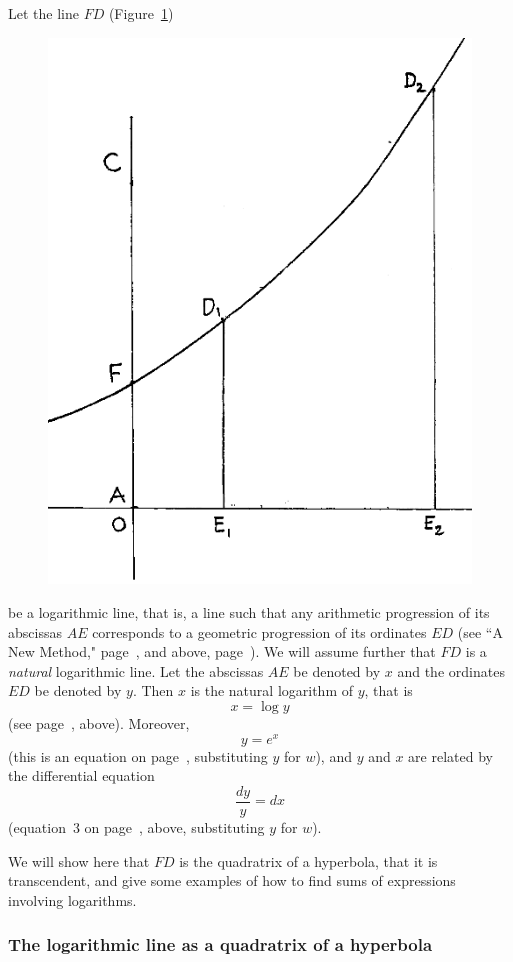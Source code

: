\documentclass[twoside,openright]{article}
\begin{document}
Let the line $FD$ (Figure~\ref{logline})
\begin{figure}[htp]
\begin{center}
\includegraphics[width=.65\textwidth]{fig/Figure51}
\caption{}
\label{logline}
\vspace{-10pt}
\end{center}
\end{figure}  be a logarithmic line, that is, a line such that any arithmetic progression of its abscissas $AE$ corresponds to a geometric progression of its ordinates $ED$ (see ``A New Method," page~\pageref{enddeb}, and above, page~\pageref{bdebeaune}).   We will assume further that $FD$ is a {\em natural} logarithmic line.  Let the abscissas $AE$ be denoted by $x$ and the ordinates $ED$ be denoted by $y$.  Then $x$ is the natural logarithm of $y$, that is
$$x = \log y$$ 
(see page~\pageref{oeq}, above). 
Moreover,
$$y=e^x$$
(this is an equation on page~\pageref{oeq}, substituting $y$ for $w$), and $y$ and $x$ are related by the differential equation
$$\frac{dy}{y} = dx$$
(equation~3 on page~\pageref{deq}, above, substituting $y$ for $w$).  

We will show here that $FD$ is the quadratrix of a hyperbola, that it is transcendent, and give some examples of how to find sums of expressions involving logarithms.




\subsubsection*{The logarithmic line as a quadratrix of a hyperbola}
\end{document}

